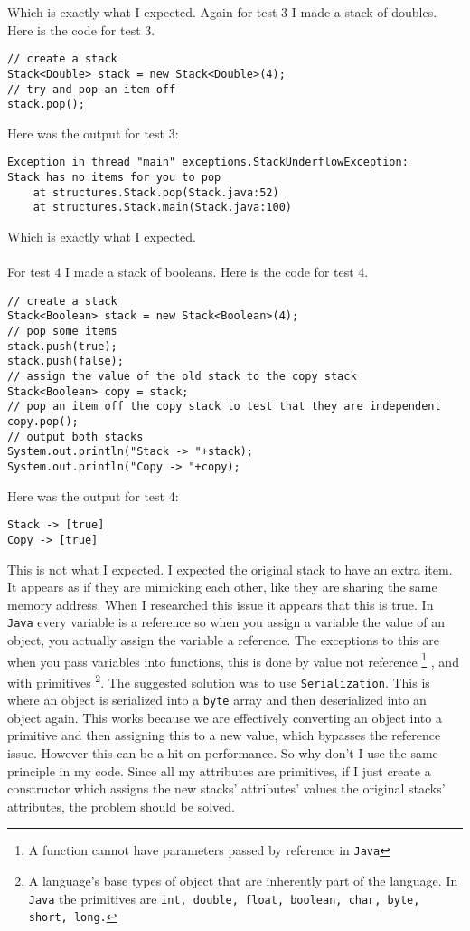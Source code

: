 \documentclass[../../../../main.tex]{subfiles}
\begin{document}
Which is exactly what I expected.
\newpage
\noindent
Again for test 3 I made a stack of doubles. Here is the code for test 3.
\begin{verbatim}
// create a stack
Stack<Double> stack = new Stack<Double>(4);
// try and pop an item off
stack.pop();
\end{verbatim}
Here was the output for test 3:
\begin{verbatim}
Exception in thread "main" exceptions.StackUnderflowException:
Stack has no items for you to pop
	at structures.Stack.pop(Stack.java:52)
	at structures.Stack.main(Stack.java:100)
\end{verbatim}
Which is exactly what I expected.\\ \\
For test 4 I made a stack of booleans. Here is the code for test 4.
\begin{verbatim}
// create a stack
Stack<Boolean> stack = new Stack<Boolean>(4);
// pop some items
stack.push(true);
stack.push(false);
// assign the value of the old stack to the copy stack 
Stack<Boolean> copy = stack;
// pop an item off the copy stack to test that they are independent
copy.pop();
// output both stacks
System.out.println("Stack -> "+stack);
System.out.println("Copy -> "+copy);
\end{verbatim}
Here was the output for test 4:
\begin{verbatim}
Stack -> [true]
Copy -> [true]
\end{verbatim}
This is not what I expected. I expected the original stack to have an extra item. It appears as if they are mimicking each other, like they are sharing the same memory address. When I researched this issue\cite{duplicationJava} it appears that this is true. In \texttt{Java} every variable is a reference so when you assign a variable the value of an object, you actually assign the variable a reference. The exceptions to this are when you pass variables into functions, this is done by value not reference
\footnote{A function cannot have parameters passed by reference\cite{byRefJava} in \texttt{Java}}
, and with primitives
\footnote{A language's base types of object that are inherently part of the language. In \texttt{Java} the primitives are \texttt{int, double, float, boolean, char, byte, short, long.}}.
The suggested solution was to use \texttt{Serialization\cite{serialize}}. This is where an object is serialized into a \texttt{byte} array and then deserialized into an object again. This works because we are effectively converting an object into a primitive and then assigning this to a new value, which bypasses the reference issue. However this can be a hit on performance. So why don't I use the same principle in my code. Since all my attributes are primitives, if I just create a constructor which assigns the new stacks' attributes' values the original stacks' attributes, the problem should be solved.
\end{document}
